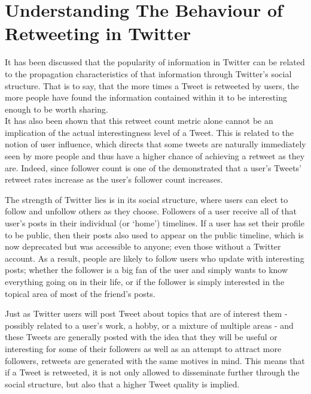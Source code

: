 \chapter{Understanding The Behaviour of Retweeting in Twitter}


It has been discussed that the popularity of information in Twitter can be related to the propagation characteristics of that information through Twitter's social structure. That is to say, that the more times a Tweet is retweeted by users, the more people have found the information contained within it to be interesting enough to be worth sharing.\\
It has also been shown that this retweet count metric alone cannot be an implication of the actual interestingness level of a Tweet. This is related to the notion of user influence, which directs that some tweets are naturally immediately seen by more people and thus have a higher chance of achieving a retweet as they are. Indeed, since follower count is one of the \cite{suh10} demonstrated that a user's Tweets' retweet rates increase as the user's follower count increases.

The strength of Twitter lies is in its social structure, where users can elect to follow and unfollow others as they choose. Followers of a user receive all of that user's posts in their individual (or `home') timelines. If a user has set their profile to be public, then their posts also used to appear on the public timeline, which is now deprecated but was accessible to anyone; even those without a Twitter account. As a result, people are likely to follow users who update with interesting posts; whether the follower is a big fan of the user and simply wants to know everything going on in their life, or if the follower is simply interested in the topical area of most of the friend's posts. 

Just as Twitter users will post Tweet about topics that are of interest them - possibly related to a user's work, a hobby, or a mixture of multiple areas - and these Tweets are generally posted with the idea that they will be useful or interesting for some of their followers as well as an attempt to attract more followers, retweets are generated with the same motives in mind. This means that if a Tweet is retweeted, it is not only allowed to disseminate further through the social structure, but also that a higher Tweet quality is implied.

